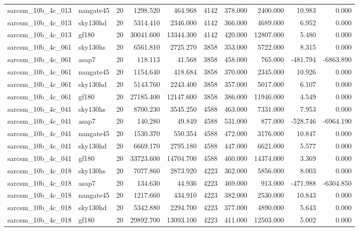 \documentclass{article}
\begin{document}
\begin{longtable}{llrrrrrrrr}
sarcsm\_10b\_4c\_013 & nangate45 & 20 & 1298.520 & 464.968 & 4142 & 378.000 & 2400.000 & 10.983 & 0.000 \\
sarcsm\_10b\_4c\_013 & sky130hd & 20 & 5314.410 & 2346.000 & 4142 & 366.000 & 4689.000 & 6.952 & 0.000 \\
sarcsm\_10b\_4c\_013 & gf180 & 20 & 30041.600 & 13344.300 & 4142 & 420.000 & 12807.000 & 5.480 & 0.000 \\
sarcsm\_10b\_4c\_061 & sky130hs & 20 & 6561.810 & 2725.270 & 3858 & 353.000 & 5722.000 & 8.315 & 0.000 \\
sarcsm\_10b\_4c\_061 & asap7 & 20 & 118.113 & 41.568 & 3858 & 458.000 & 765.000 & -481.794 & -6863.890 \\
sarcsm\_10b\_4c\_061 & nangate45 & 20 & 1154.640 & 418.684 & 3858 & 370.000 & 2345.000 & 10.926 & 0.000 \\
sarcsm\_10b\_4c\_061 & sky130hd & 20 & 5143.760 & 2243.400 & 3858 & 357.000 & 5017.000 & 6.107 & 0.000 \\
sarcsm\_10b\_4c\_061 & gf180 & 20 & 27185.400 & 12147.600 & 3858 & 386.000 & 11946.000 & 4.549 & 0.000 \\
sarcsm\_10b\_4c\_041 & sky130hs & 20 & 8700.230 & 3545.250 & 4588 & 463.000 & 7331.000 & 7.953 & 0.000 \\
sarcsm\_10b\_4c\_041 & asap7 & 20 & 140.280 & 49.849 & 4588 & 531.000 & 877.000 & -528.746 & -6964.190 \\
sarcsm\_10b\_4c\_041 & nangate45 & 20 & 1530.370 & 550.354 & 4588 & 472.000 & 3176.000 & 10.847 & 0.000 \\
sarcsm\_10b\_4c\_041 & sky130hd & 20 & 6669.170 & 2795.180 & 4588 & 447.000 & 6621.000 & 5.577 & 0.000 \\
sarcsm\_10b\_4c\_041 & gf180 & 20 & 33723.600 & 14704.700 & 4588 & 460.000 & 14374.000 & 3.369 & 0.000 \\
sarcsm\_10b\_4c\_018 & sky130hs & 20 & 7077.860 & 2873.920 & 4223 & 362.000 & 5856.000 & 8.003 & 0.000 \\
sarcsm\_10b\_4c\_018 & asap7 & 20 & 134.630 & 44.936 & 4223 & 469.000 & 913.000 & -471.988 & -6304.850 \\
sarcsm\_10b\_4c\_018 & nangate45 & 20 & 1217.660 & 434.910 & 4223 & 382.000 & 2530.000 & 10.843 & 0.000 \\
sarcsm\_10b\_4c\_018 & sky130hd & 20 & 5342.880 & 2294.700 & 4223 & 377.000 & 4890.000 & 5.643 & 0.000 \\
sarcsm\_10b\_4c\_018 & gf180 & 20 & 29892.700 & 13093.100 & 4223 & 411.000 & 12503.000 & 5.002 & 0.000 \\

\end{longtable}
\end{document}
